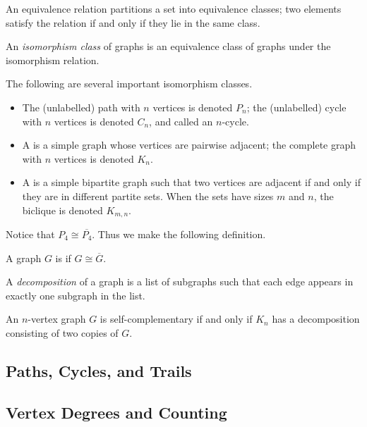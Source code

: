 An equivalence relation partitions a set into equivalence classes; two elements satisfy the relation if and only if they lie in the same class.

\begin{definition}
An \emph{isomorphism class} of graphs is an equivalence class of graphs under the isomorphism relation.
\end{definition}

The following are several important isomorphism classes.
\begin{itemize}
\item The (unlabelled) path with $n$ vertices is denoted $P_n$; the (unlabelled) cycle with $n$ vertices is denoted $C_n$, and called an $n$-cycle.
\item A  is a simple graph whose vertices are pairwise adjacent; the complete graph with $n$ vertices is denoted $K_n$.
\item A  is a simple bipartite graph such that two vertices are adjacent if and only if they are in different partite sets. When the sets have sizes $m$ and $n$, the biclique is denoted $K_{m,n}$.
\end{itemize}

Notice that $P_4\cong \overline{P_4}$. Thus we make the following definition.

\begin{definition}
A graph $G$ is  if $G\cong\overline{G}$.
\end{definition}

A \emph{decomposition} of a graph is a list of subgraphs such that each edge appears in exactly one subgraph in the list.

\begin{lemma}
An $n$-vertex graph $G$ is self-complementary if and only if $K_n$ has a decomposition consisting of two copies of $G$.
\end{lemma}

\begin{example}

\end{example}

\subsection{Paths, Cycles, and Trails}
\subsection{Vertex Degrees and Counting}
